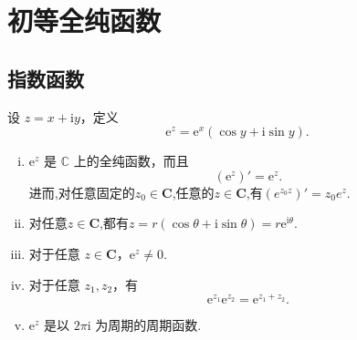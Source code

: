 \documentclass[../../main.tex]{subfiles}
\begin{document}
\section{初等全纯函数}

\subsection{指数函数}

\begin{definition}[指数函数]
设 \( z = x + \mathrm{i}y \)，定义
\[
\mathrm{e}^z = \mathrm{e}^x (\cos y + \mathrm{i}\sin y).
\]
\end{definition}

\begin{proposition}\label{proposition:指数函数的性质}
\begin{enumerate}[(i)]
\item \( \mathrm{e}^z \) 是 \( \mathbb{C} \) 上的全纯函数，而且
\[
(\mathrm{e}^z)' = \mathrm{e}^z.
\]
进而,对任意固定的$z_0\in \mathbf{C}$,任意的$z\in \mathbf{C}$,有$(e^{z_0z})'=z_0e^{z}.$

\item 对任意\( z \in \mathbf{C} \),都有\( z = r(\cos\theta + \mathrm{i}\sin\theta)= r\mathrm{e}^{\mathrm{i}\theta} \).

\item 对于任意 \( z \in \mathbf{C} \)，\( \mathrm{e}^z \neq 0 \). 

\item 对于任意 \( z_1, z_2 \)，有
\[
\mathrm{e}^{z_1} \mathrm{e}^{z_2} = \mathrm{e}^{z_1 + z_2}.
\]

\item \( \mathrm{e}^z \) 是以 \( 2\pi\mathrm{i} \) 为周期的周期函数.
\end{enumerate}
\end{proposition}
\end{document}

